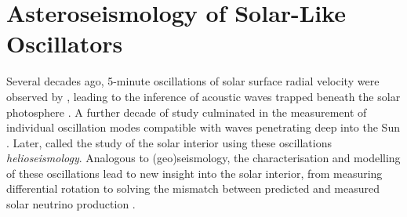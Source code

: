 %
%
%
%
%
\chapter[Asteroseismology]{Asteroseismology of Solar-Like Oscillators}

Several decades ago, 5-minute oscillations of solar surface radial velocity were observed by \citet{Leighton.Noyes.ea1962}, leading to the inference of acoustic waves trapped beneath the solar photosphere \citep{Ulrich1970}. A further decade of study culminated in the measurement of individual oscillation modes compatible with waves penetrating deep into the Sun \citep[e.g.][]{Claverie.Isaak.ea1979}. Later, \citet{Deubner.Gough1984} called the study of the solar interior using these oscillations \emph{helioseismology}. Analogous to (geo)seismology, the characterisation and modelling of these oscillations lead to new insight into the solar interior, from measuring differential rotation \citep{Deubner.Ulrich.ea1979} to solving the mismatch between predicted and measured solar neutrino production \citep{Bahcall.Ulrich1988}.


